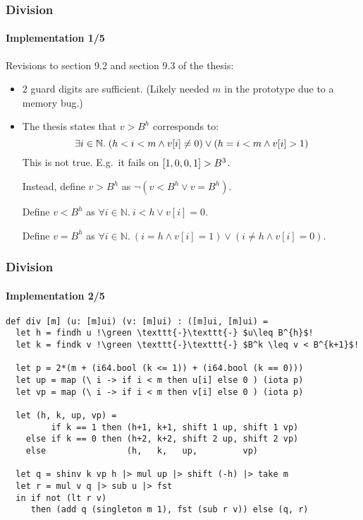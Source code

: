 \begin{frame}[fragile]
  \frametitle{Division}
  \framesubtitle{Implementation 1/5}
  Revisions to section 9.2 and section 9.3 of the thesis:
  \begin{itemize}
  \item $2$ guard digits are sufficient.\newline
    (Likely needed $m$ in the prototype due
    to a memory bug.)\pause
  \item The thesis states that $v > B^h$ corresponds to:
    \begin{equation}\footnotesize
    \exists i\in \mathbb{N}.~(h<i<m \land v[i] \neq 0) \lor (h = i<m \land v[i] > 1)
  \end{equation}
  This is not true. E.g.\ it fails on $\mathtt{[}1,0,0,1\mathtt{]} > B^3$.\pause

  Instead, define $v > B^h$ as {\footnotesize $\neg(v < B^h \lor v = B^h)$}.

  Define $v < B^h$ as {\footnotesize $\forall i\in \mathbb{N}.~i < h \lor v[i] = 0$}.

  Define $v = B^h$ as {\footnotesize $\forall i\in \mathbb{N}.~(i=h \land v[i] = 1) \lor (i \neq h \land v[i] = 0)$}.
    \end{itemize}
  \end{frame}

\begin{frame}[fragile]
  \frametitle{Division}
  \framesubtitle{Implementation 2/5}
\begin{lstlisting}[language=futhark,basicstyle=\scriptsize,escapeinside=!!,frame=single]
def div [m] (u: [m]ui) (v: [m]ui) : ([m]ui, [m]ui) =
  let h = findh u !\green \texttt{-}\texttt{-} $u\leq B^{h}$!
  let k = findk v !\green \texttt{-}\texttt{-} $B^k \leq v < B^{k+1}$!

  let p = 2*(m + (i64.bool (k <= 1)) + (i64.bool (k == 0)))
  let up = map (\ i -> if i < m then u[i] else 0 ) (iota p)
  let vp = map (\ i -> if i < m then v[i] else 0 ) (iota p)

  let (h, k, up, vp) =
         if k == 1 then (h+1, k+1, shift 1 up, shift 1 vp)
    else if k == 0 then (h+2, k+2, shift 2 up, shift 2 vp)
    else                (h,   k,   up,         vp)

  let q = shinv k vp h |> mul up |> shift (-h) |> take m
  let r = mul v q |> sub u |> fst
  in if not (lt r v)
     then (add q (singleton m 1), fst (sub r v)) else (q, r)
\end{lstlisting}
\end{frame}

